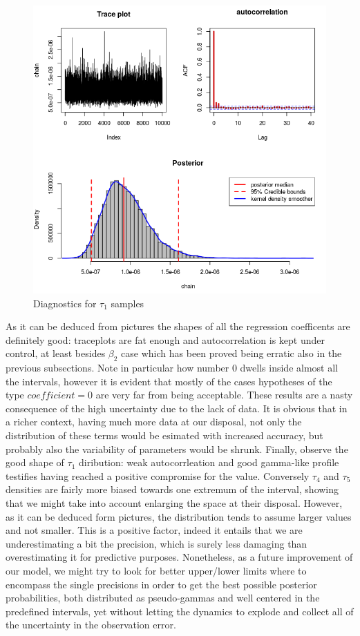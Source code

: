 \documentclass[11pt,twoside]{report}
\begin{document}
\begin{figure}[H]
		\centering
		\includegraphics[width=58 mm]{pictures/tau_1.png}
		\caption{Diagnostics for $ \tau_1 $ samples}
		\label{fig:tau_1}
\end{figure}%

As it can be deduced from pictures the shapes of all the regression coefficents are definitely good: traceplots are fat enough and autocorrelation is kept under control, at least besides $\beta_2$ case which has been proved being erratic also in the previous subsections. Note in particular how number 0 dwells inside almost all the intervals, however it is evident that mostly of the cases hypotheses of the type $ coefficient=0 $ are very far from being acceptable. These results are a nasty consequence of the high uncertainty due to the lack of data. It is obvious that in a richer context, having much more data at our disposal, not only the distribution of these terms would be esimated with increased accuracy, but probably also the variability of parameters would be shrunk. Finally, observe the good shape of $ \tau_1 $ diribution: weak autocorrleation and good gamma-like profile testifies having reached a positive compromise for the value. Conversely $\tau_4$ and $\tau_5$ densities are fairly more biased towards one extremum of the interval, showing that we might take into account enlarging the space at their disposal. However, as it can be deduced form pictures, the distribution tends to assume larger values and not smaller. This is a positive factor, indeed it entails that we are underestimating a bit the precision, which is surely less damaging than overestimating it for predictive purposes. Nonetheless, as a future improvement of our model, we might try to look for better upper/lower limits where to encompass the single precisions in order to get the best possible posterior probabilities, both distributed as pseudo-gammas and well centered in the predefined intervals, yet without letting the dynamics to explode and collect all of the uncertainty in the observation error.
\end{document}
